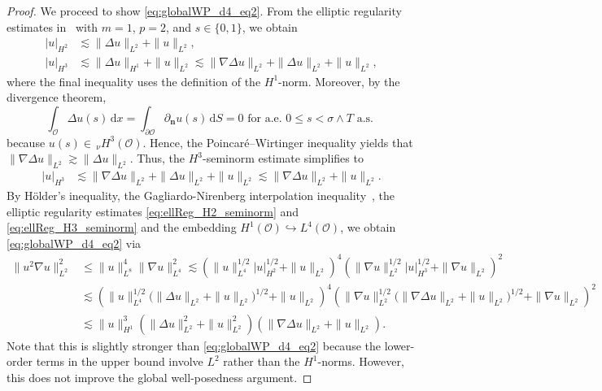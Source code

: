 \documentclass[reqno]{amsart}
\newcommand{\sO}{\mathscr{O}}
\newcommand{\1}{\mathbf{1}}
\newcommand{\grad}{\nabla}
\newcommand{\rmd}{\mathrm{d}}
\newcommand{\dx}{\,\mathrm{d}x}
\newcommand{\nH}{\ensuremath{\,_\nu H}}
\begin{document}
\begin{proof}
We proceed to show \eqref{eq:globalWP_d4_eq2}. From the elliptic regularity estimates in~\cite[Chapter~5.3.4]{triebelInterpolationTheoryFunction1978} with $m=1$, $p=2$, and $s\in\{0,1\}$, we obtain
\begin{align} \label{eq:ellReg_H2_seminorm}
    |u|_{H^2} &\lesssim \|\Delta u\|_{L^2}+\|u\|_{L^2},\\
    |u|_{H^3} &\lesssim \|\Delta u\|_{H^1}+\|u\|_{L^2} \lesssim \|\grad \Delta u\|_{L^2}+\|\Delta u\|_{L^2}+\|u\|_{L^2},\nonumber
\end{align}
where the final inequality uses the definition of the $H^1$-norm.
Moreover, by the divergence theorem, 
\begin{equation}
\label{eq:proofDivergenceThm}
    \int_{\sO} \Delta u(s) \dx=\int_{\partial\sO} \partial_{\mathbf{n}}u(s) \,\rmd S=0\text{ for a.e.\ }0 \le s <\sigma \land T \text{ a.s.\ }
\end{equation}
because $u(s)\in \nH^3(\sO)$. Hence, the Poincaré--Wirtinger inequality yields that $\|\grad \Delta u\|_{L^2} \gtrsim \|\Delta u\|_{L^2}$. Thus, the $H^3$-seminorm estimate simplifies to
\begin{align}
    |u|_{H^3} &\lesssim \|\grad \Delta u\|_{L^2}+\|\Delta u\|_{L^2}+\|u\|_{L^2} \lesssim \|\grad \Delta u\|_{L^2}+\|u\|_{L^2}.\label{eq:ellReg_H3_seminorm}
\end{align}
By Hölder's inequality, the Gagliardo-Nirenberg interpolation
inequality~\cite{Nirenberg59}, the elliptic regularity estimates \eqref{eq:ellReg_H2_seminorm} and \eqref{eq:ellReg_H3_seminorm} and the embedding $H^1(\sO) \hookrightarrow L^4(\sO)$, we obtain \eqref{eq:globalWP_d4_eq2} via
\begin{align*}
    \|u^2\nabla u\|_{L^2}^2
    & \leq \|u\|_{L^8}^4 \|\nabla u\|_{L^4}^2  
    \lesssim \left( \|u\|_{L^4}^{1/2} |u|_{H^2}^{1/2} + \|u\|_{L^2} \right)^4 \left( \|\nabla u\|_{L^2}^{1/2} |u|_{H^3}^{1/2} + \|\grad u\|_{L^2} \right)^2 \\
    &\lesssim\left( \|u\|_{L^4}^{1/2} \big(\|\Delta u\|_{L^2}+\|u\|_{L^2}\big)^{1/2} + \|u\|_{L^2} \right)^4
    \left(\|\nabla u\|_{L^2}^{1/2}\big(\|\grad \Delta u\|_{L^2}+\|u\|_{L^2}\big)^{1/2} + \|\grad u\|_{L^2} \right)^2 \\
    & \lesssim \|u\|^3_{H^1} \left(\|\Delta u\|_{L^2}^2 +\|u\|^2_{L^2}\right) \left( \|\grad \Delta u\|_{L^2} + \|u\|_{L^2}\right).
\end{align*}
Note that this is slightly stronger than \eqref{eq:globalWP_d4_eq2} because the lower-order terms in the upper bound involve $L^2$ rather than the $H^1$-norms. However, this does not improve the global well-posedness argument.



\end{proof}
\end{document}
